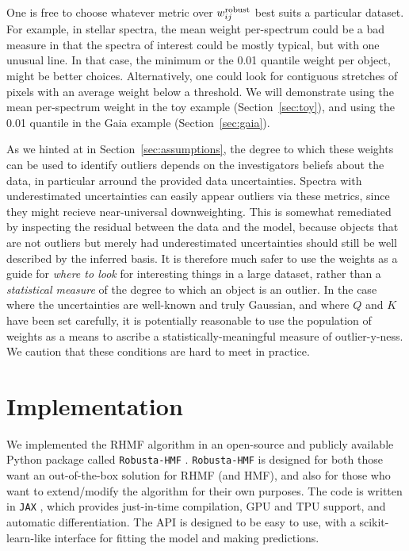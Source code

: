 \documentclass[onecolumn,floatfix]{aastex631}
\begin{document}
One is free to choose whatever metric over $w^{\rm robust}_{ij}$ best suits a particular dataset.
For example, in stellar spectra, the mean weight per-spectrum could be a bad measure in that the spectra of interest could be mostly typical, but with one unusual line.
In that case, the minimum or the 0.01 quantile weight per object, might be better choices.
Alternatively, one could look for contiguous stretches of pixels with an average weight below a threshold.
We will demonstrate using the mean per-spectrum weight in the toy example (Section~\ref{sec:toy}), and using the 0.01 quantile in the Gaia example (Section~\ref{sec:gaia}).

As we hinted at in Section~\ref{sec:assumptions}, the degree to which these weights can be used to identify outliers depends on the investigators beliefs about the data, in particular arround the provided data uncertainties.
Spectra with underestimated uncertainties can easily appear outliers via these metrics, since they might recieve near-universal downweighting.
This is somewhat remediated by inspecting the residual between the data and the model, because objects that are not outliers but merely had underestimated uncertainties should still be well described by the inferred basis.
It is therefore much safer to use the weights as a guide for \emph{where to look} for interesting things in a large dataset, rather than a \emph{statistical measure} of the degree to which an object is an outlier.
In the case where the uncertainties are well-known and truly Gaussian, and where $Q$ and $K$ have been set carefully, it is potentially reasonable to use the population of weights as a means to ascribe a statistically-meaningful measure of outlier-y-ness.
We caution that these conditions are hard to meet in practice.

\section{Implementation}

We implemented the RHMF algorithm in an open-source and publicly available Python package called \texttt{Robusta-HMF} \citep{hilder2026}.
\texttt{Robusta-HMF} is designed for both those want an out-of-the-box solution for RHMF (and HMF), and also for those who want to extend/modify the algorithm for their own purposes.
The code is written in \texttt{JAX} \citep{jax2018github}, which provides just-in-time compilation, GPU and TPU support, and automatic differentiation.
The API is designed to be easy to use, with a scikit-learn-like \citep{scikit-learn} interface for fitting the model and making predictions.
\end{document}
